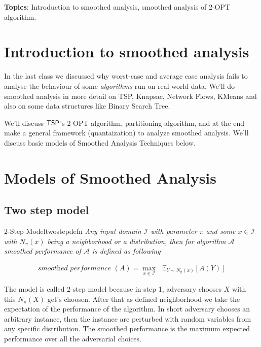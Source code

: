 \documentclass[12pt, a4paper]{article}
\newcommand{\tsp}{{\sf TSP}}
\begin{document}
\MakeScribeTop

\textbf{Topics}: Introduction to smoothed analysis, smoothed analysis of 2-{\sf OPT} algorithm.

\section{Introduction to smoothed analysis}
In the last class we discussed why worst-case and average case analysis fails to analyse the behaviour of some \textit{algorithms} run on real-world data. We'll do smoothed analysis in more detail on \tsp, {\sf Knapsac}, {\sf Network Flows}, {\sf KMeans} and also on some data structures like {\sf Binary Search Tree}.

We'll discuss $\tsp$'s 2-{\sf OPT} algorithm, partitioning algorithm, and at the end make a general framework (quantaization) to analyze smoothed analysis. We'll discuss basic models of {\sf Smoothed Analysis Techniques} below.

\section{Models of Smoothed Analysis}
\subsection{Two step model}

\begin{define}{2-Step Model}{twostepdefn}
	\textit{Any input domain $\mathcal{I}$ with parameter $\pi$ and some $x \in \mathcal{I}$ with $N_{\pi}(x)$ being a neighborhood or a distribution, then for algorithm $\mathcal{A}$ smoothed performance of $\mathcal{A}$ is defined as following}

    \begin{align*}
        \textit{smoothed performance }(A) = \max_{x \in \mathcal{I}} \:\:\: \mathbb{E}_{{Y \sim {N_{\pi}(x)}}}[A(Y)]
    \end{align*}
\end{define}

The model is called 2-step model because in step 1, adversary chooses $X$ with this $N_{\pi}(X)$ get's choosen. After that as defined neighborhood we take the expectation of the performance of the algorithm. In short adversary chooses an arbitrary instance, then the instance are perturbed with random variables from any specific distribution. The smoothed performance is the maximum expected performance over all the adversarial choices.
\end{document}
